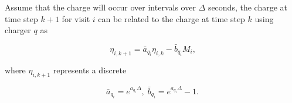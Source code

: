 \documentclass[ee,thesis]{usuthesis}
\begin{document}
\begin{lemma}
Assume that the charge will occur over intervals over $\Delta$ seconds, the charge at time step $k+1$ for visit $i$ can be related to the charge at time step $k$ using charger $q$ as

\begin{equation}
\eta_{i,k+1} = \bar{a}_{q_i} \eta_{i,k} - \bar{b}_{q_i} M_i\text{,}
\end{equation}

where $\eta_{i, k+1}$ represents a discrete

\begin{equation}
\label{eq:nonlin-discrete-model}
\bar{a}_{q_i} = e^{a_{q_i} \Delta},\; \bar{b}_{q_i} = e^{a_{q_i} \Delta} - 1\text{.}
\end{equation}
\end{lemma}
\end{document}
